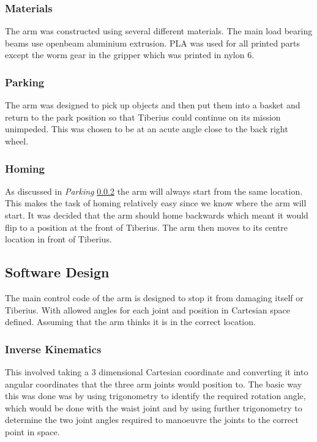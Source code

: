 \subsubsection{Materials}
The arm was constructed using several different materials. The main load bearing beams use openbeam aluminium extrusion. PLA was used for all printed parts except the worm gear in the gripper which was printed in nylon 6.

\subsubsection{Parking} \label{parking}
The arm was designed to pick up objects and then put them into a basket and return to the park position so that Tiberius could continue on its mission unimpeded. This was chosen to be at an acute angle close to the back right wheel.

\subsubsection{Homing}
As discussed in \textit{Parking} \ref{parking} the arm will always start from the same location. This makes the task of homing relatively easy since we know where the arm will start. It was decided that the arm should home backwards which meant it would flip to a position at the front of Tiberius. The arm then moves to its centre location in front of Tiberius. 



\subsection{Software Design}
The main control code of the arm is designed to stop it from damaging itself or Tiberius. With allowed angles for each joint and position in Cartesian space defined. Assuming that the arm thinks it is in the correct location.

\subsubsection{Inverse Kinematics}

This involved taking a 3 dimensional Cartesian coordinate and converting it into angular coordinates that the three arm joints would position to.  The basic way this was done was by using trigonometry to identify the required rotation angle, which would be done with the waist joint and by using further trigonometry to determine the two joint angles required to manoeuvre the joints to the correct point in space.	

